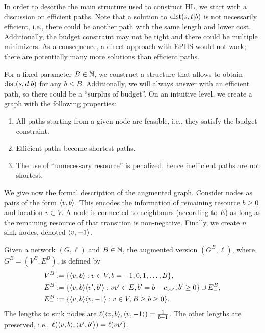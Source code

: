 In order to describe the main structure used to construct HL, we start with a discussion on efficient paths.
Note that a solution to $\text{dist}(s,t|b)$ is not necessarily efficient, i.e., there could be another path with the same length and lower cost.
Additionally, the budget constraint may not be tight and there could be multiple minimizers. 
As a consequence, a direct approach with EPHS would not work; there are potentially many more solutions than efficient paths.

For a fixed parameter $B\in \mathbb{N}$, we construct a structure that allows to obtain $\text{dist}(s,d|b)$ for any $b\leq B$.
Additionally, we will always answer with an efficient path, so there could be a ``surplus of budget''.
On an intuitive level, we create a graph with the following properties:
\begin{enumerate}
\item All paths starting from a given node are feasible, i.e., they satisfy the budget constraint.
\item Efficient paths become shortest paths.
\item The use of ``unnecessary resource'' is penalized, hence inefficient paths are not shortest.
\end{enumerate}

We give now the formal description of the augmented graph.
Consider nodes as pairs of the form $\langle v,b\rangle$. 
This encodes the information of remaining resource $b\geq 0$ and location $v\in V$.
A node is connected to neighbours (according to $E$) as long as the remaining resource of that transition is non-negative.
Finally, we create $n$ sink nodes, denoted $\langle v,-1\rangle$.

\begin{definition}
Given a network $(G,\ell)$ and $B\in\mathbb{N}$, the augmented version $(G^B,\ell)$, where $G^B=(V^B,E^B)$, is defined by
\begin{align*}
V^B &:=\{\langle v,b\rangle: v\in V, b=-1,0,1,\ldots,B\},\\
E^B &:=\{\langle v,b\rangle\langle v',b'\rangle : vv'\in E, b'=b-c_{vv'}, b'\geq 0\}\cup E^{B}_{-},\\
E^{B}_{-} &:= \{\langle v,b\rangle\langle v,-1\rangle: v\in V, B\geq b\geq 0\}.
\end{align*}
The lengths to sink nodes are $\ell(\langle v,b\rangle,\langle v,-1\rangle)=\frac{1}{b+1}$.
The other lengths are preserved, i.e., $\ell(\langle v,b\rangle,\langle v',b'\rangle)=\ell(vv')$.
\end{definition}

